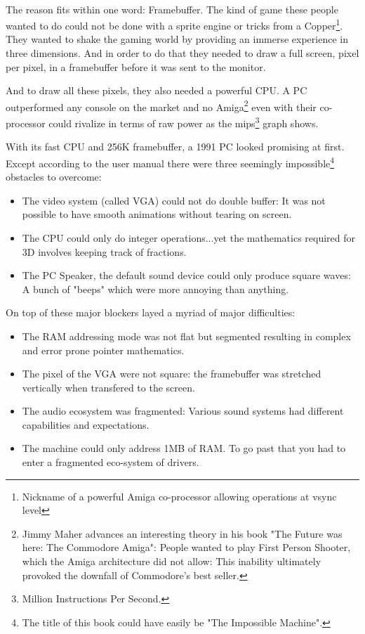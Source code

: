 \\
The reason fits within one word: Framebuffer. The kind of game these people wanted to do could not be done with a sprite engine or tricks from a Copper\footnote{Nickname of a powerful Amiga co-processor allowing operations at vsync level}. They wanted to shake the gaming world by providing an immerse experience in three dimensions. And in order to do that they needed to draw a full screen, pixel per pixel, in a framebuffer before it was sent to the monitor. \\
\par
And to draw all these pixels, they also needed a powerful CPU. A PC outperformed any console on the market and no Amiga\footnote{Jimmy Maher advances an interesting theory in his book "The Future was here: The Commodore Amiga": People wanted to play First Person Shooter, which the Amiga architecture did not allow: This inability ultimately provoked the downfall of Commodore's best seller.} even with their co-processor could rivalize in terms of raw power as the mips\footnote{Million Instructions Per Second.} graph shows.
\par


 
With its fast CPU and 256K framebuffer, a 1991 PC looked promising at first. Except according to the user manual there were three seemingly impossible\footnote{The title of this book could have easily be "The Impossible Machine".} obstacles to overcome:\\
\begin{itemize}
\item The video system (called VGA) could not do double buffer: It was not possible to have smooth animations without tearing on screen.
\item The CPU could only do integer operations...yet the mathematics required for 3D involves keeping track of fractions.
\item The PC Speaker, the default sound device could only produce square waves: A bunch of "beeps" which were more annoying than anything.
\end{itemize}
On top of these major blockers layed a myriad of major difficulties:\\
\begin{itemize}
\item The RAM addressing mode was not flat but segmented resulting in complex and error prone pointer mathematics.
\item The pixel of the VGA were not square: the framebuffer was stretched vertically when
transfered to the screen.
\item The audio ecosystem was fragmented: Various sound systems had different capabilities and expectations.
\item The machine could only address 1MB of RAM. To go past that you had to enter a fragmented eco-system of drivers.
\end{itemize}

